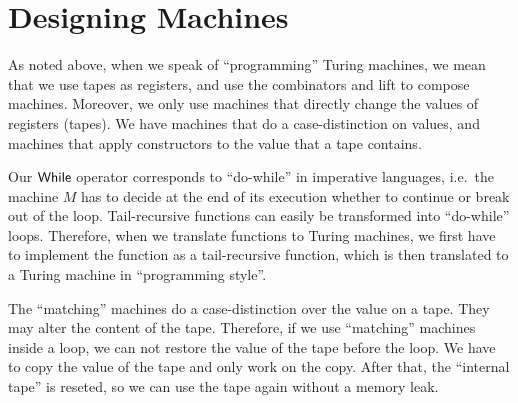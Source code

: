 \section{Designing Machines}
\label{sec:programming-design}

As noted above, when we speak of ``programming'' Turing machines, we mean that we use tapes as registers, and use the combinators and lift to compose
machines.  Moreover, we only use machines that directly change the values of registers (tapes).  We have machines that do a case-distinction on
values, and machines that apply constructors to the value that a tape contains.

Our $\mathsf{While}$ operator corresponds to ``do-while'' in imperative languages, i.e.\ the machine $M$ has to decide at the end of its execution whether to
continue or break out of the loop.  Tail-recursive functions can easily be transformed into ``do-while'' loops.  Therefore, when we translate
functions to Turing machines, we first have to implement the function as a tail-recursive function, which is then translated to a Turing machine in
``programming style''.

The ``matching'' machines do a case-distinction over the value on a tape.  They may alter the content of the tape.  Therefore, if we use ``matching''
machines inside a loop, we can not restore the value of the tape before the loop.  We have to copy the value of the tape and only work on the copy.
After that, the ``internal tape'' is reseted, so we can use the tape again without a memory leak.


